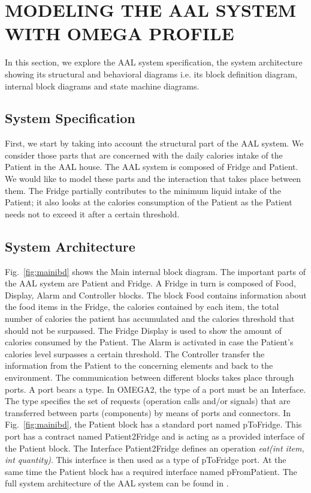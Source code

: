 \documentclass[a4paper,twoside]{article}
\begin{document}

\section{\uppercase{Modeling the AAL system with OMEGA Profile}}
\label{sec:aal_model}
In this section, we explore the AAL system specification, the system architecture showing its structural and behavioral diagrams i.e. its block definition diagram, internal block diagrams and state machine diagrams.

\subsection{System Specification}
First, we start by taking into account the structural part of the AAL system. We consider those parts that are concerned with the daily calories intake of the Patient in the AAL house. The AAL system is composed of Fridge and Patient. We would like to model these parts and the interaction that takes place between them. The Fridge partially contributes to the minimum liquid intake of the Patient; it also looks at the calories consumption of the Patient as the Patient needs not to exceed it after a certain threshold. 

\subsection{System Architecture}
Fig.~\ref{fig:mainibd} shows the Main internal block diagram. The important parts of the AAL system are Patient and Fridge. A Fridge in turn is composed of Food, Display, Alarm and Controller blocks. The block Food contains information about the food items in the Fridge, the calories contained by each item, the total number of calories the patient has accumulated and the calories threshold that should not be surpassed. The Fridge Display is used to show the amount of calories consumed by the Patient. The Alarm is activated in case the Patient's calories level surpasses a certain threshold. The Controller transfer the information from the Patient to the concerning elements and back to the environment. The communication between different blocks takes place through ports. A  port  bears  a  type.  In  OMEGA2,  the  type  of  a  port  must  be  an  Interface. The type specifies the set of requests (operation calls and/or signals) that  are transferred between parts (components) by means of ports and connectors. In Fig.~\ref{fig:mainibd}, the Patient block has a standard port named pToFridge. This port has a contract named Patient2Fridge and is acting as a provided interface of the Patient block. The Interface Patient2Fridge defines an operation \textit{eat(int item, int quantity)}. This interface is then used as a type of pToFridge port. At the same time the Patient block has a required interface named pFromPatient. The full system architecture of the AAL system can be found in \cite{test15}. 
\end{document}
